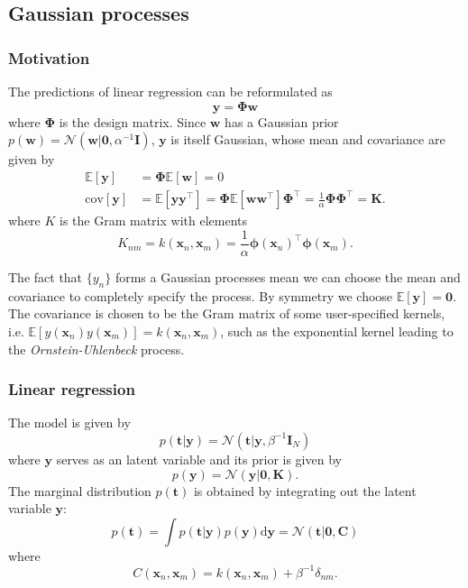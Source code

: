 \documentclass[a4paper]{book}
\newcommand{\ud}{\mathrm{d}}
\newcommand{\up}{\mathrm}
\renewcommand{\bf}{\mathbf}
\renewcommand{\cal}{\mathcal}
\newcommand{\bb}{\mathbb}
\newcommand{\imp}[1]{\textit{#1}}
\newcommand{\bs}{\boldsymbol}
\begin{document}
\subsection{Gaussian processes}
\subsubsection{Motivation}
The predictions of linear regression can be reformulated as
\begin{equation}
	\bf{y } = \bs{\Phi} \bf{w}
\end{equation}
where $\bs{\Phi}$ is the design matrix. Since $\bf{w}$ has a Gaussian prior $p(\bf{w}) = \cal{N}(\bf{w}|\bf{0},\alpha^{-1}\bf{I})$, $\bf{y}$ is itself Gaussian, whose mean and covariance are given by
\begin{align}
	\bb{E}[\bf{y}] &= \bs{\Phi} \bb{E}[\bf{w}] = 0\\
	\up{cov}[\bf{y}] &= \bb{E}[\bf{y}\bf{y}^{\intercal}] = \bs{\Phi}\bb{E}[\bf{w}\bf{w}^{\intercal}]\bs{\Phi}^{\intercal} = \frac{1}{\alpha}\bs{\Phi}\bs{\Phi}^{\intercal} = \bf{K}.
\end{align}
where $K$ is the Gram matrix with elements
\begin{equation}
	K_{nm} = k(\bf{x}_n,\bf{x}_m) = \frac{1}{\alpha} \bs{\phi}(\bf{x}_n)^{\intercal} \bs{\phi}(\bf{x}_m).
\end{equation}

The fact that $\{ y_n \}$ forms a Gaussian processes mean we can choose the mean and covariance to completely specify the process. By symmetry we choose $\bb{E}[\bf{y}] = \bf{0}$. The covariance is chosen to be the Gram matrix of some user-specified kernels, i.e. $\bb{E}[y(\bf{x}_n) y(\bf{x}_m)]=k(\bf{x}_n,\bf{x}_m)$, such as the exponential kernel leading to the \imp{Ornstein-Uhlenbeck} process.
\subsubsection{Linear regression}
The model is given by
\begin{equation}
	p(\bf{t|y}) = \cal{N}(\bf{t|y},\beta^{-1} \bf{I}_N)
\end{equation}
where $\bf{y}$ serves as an latent variable and its prior is given by
\begin{equation}
	p(\bf{y}) = \cal{N}(\bf{y|0,K}).
\end{equation}
The marginal distribution $p(\bf{t})$ is obtained by integrating out the latent variable $\bf{y}$:
\begin{equation}
	p(\bf{t}) = \int p(\bf{t|y})p(\bf{y}) \ud \bf{y} = \cal{N}(\bf{t}|\bf{0,C})
\end{equation}
where
\begin{equation}
	C(\bf{x}_n,\bf{x}_m) = k(\bf{x}_n,\bf{x}_m) + \beta^{-1} \delta_{nm}. \label{GauPro1}
\end{equation}
\end{document}

